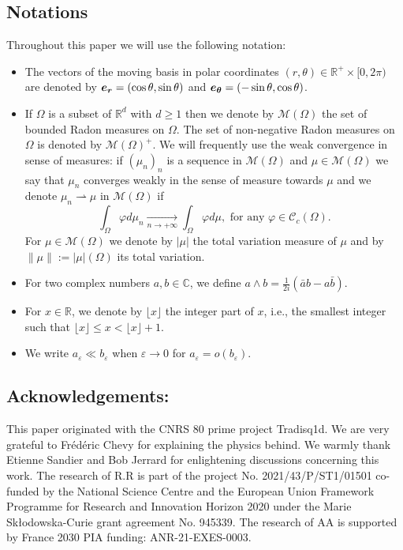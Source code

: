 \documentclass[12pt,reqno]{amsart}
\def\C{{\mathcal C}}
\def \O{{\Omega}}
\def\M{{\mathcal M}}
\def\e {{\varepsilon}}
\renewcommand{\vec}[1]{\text{\boldmath $#1$}}
\newcommand{\R}{\mathbb{R}}
\numberwithin{equation}{section}
\begin{document}
\subsection{Notations} Throughout this paper we will use the following notation:
\begin{itemize}
\item[-] The vectors of the moving basis in polar coordinates \( (r,\theta)\in \R^+\times [0,2\pi)\) are denoted by \( \vec{e_r}=(\cos \theta,\sin \theta)\) and \(\vec{e_\theta}=(-\sin \theta, \cos \theta)\).
\item[-] If \(\Omega\) is a subset of \(\R^d\) with \(d\geq 1\) then we denote by \(\M(\Omega)\)  the set of bounded Radon measures on \(\Omega\). The set of non-negative Radon measures on \(\Omega\) is denoted by \(\M(\Omega)^+\). We will frequently use the weak convergence in sense of measures: if \( (\mu_n)_n\) is a sequence in \(\M(\O)\) and \(\mu\in \M(\Omega)\) we say that \(\mu_n\) converges weakly in the sense of measure towards \(\mu\) and we denote \(\mu_n \rightharpoonup \mu\) in \(\M(\Omega)\) if 
\[ \int_{\Omega} \varphi d \mu_n \xrightarrow [n \to +\infty]{} \int_{\Omega} \varphi d \mu, \text{ for any } \varphi \in \C_c(\Omega).\]
For \(\mu\in \M(\Omega)\) we denote by \(|\mu|\) the total variation measure of \(\mu\) and by \(\|\mu\|:=|\mu|(\Omega)\) its total variation.
\item[-] For two complex numbers \(a,b\in \mathbb{C}\), we define \(a\wedge b=\frac{1}{2i} (\bar{a}b-a\bar{b})\).
\item[-] For \(x\in \R\), we denote by \(\lfloor x \rfloor \) the integer part of \(x\), i.e., the smallest integer such that \(\lfloor x \rfloor\leq x <\lfloor x \rfloor+1\).
\item[-] We write \(a_\e \ll b_\e\) when \(\e \to 0\) for \(a_\e=o(b_\e)\).
\end{itemize}

\subsection{Acknowledgements:} This paper originated with the CNRS 80 prime project Tradisq1d.
We are very grateful to Fr\'ed\'eric Chevy for explaining the physics behind. We warmly thank Etienne Sandier and Bob Jerrard
 for  enlightening discussions concerning this work. The research of R.R is part of the project 
 No. 2021/43/P/ST1/01501
 co-funded by the National Science Centre and the European Union Framework Programme for Research and Innovation Horizon 2020 under the Marie Skłodowska-Curie grant agreement No. 945339. The research of AA is supported by France 2030 PIA funding: ANR-21-EXES-0003.
\end{document}
